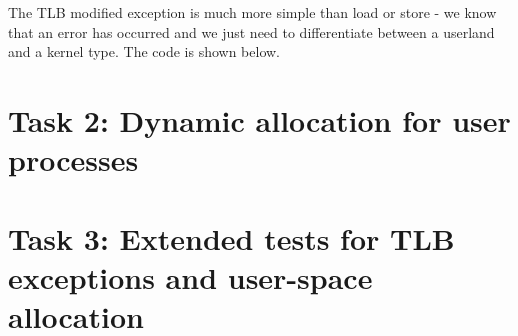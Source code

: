 \documentclass[a4paper,12pt]{article}
\begin{document}
The TLB modified exception is much more simple than load or store - we know that an error has occurred and we just need to differentiate between a userland and a kernel type. The code is shown below. 


\section{Task 2: Dynamic allocation for user processes}

\section{Task 3: Extended tests for TLB exceptions and user-space allocation}
\end{document}
